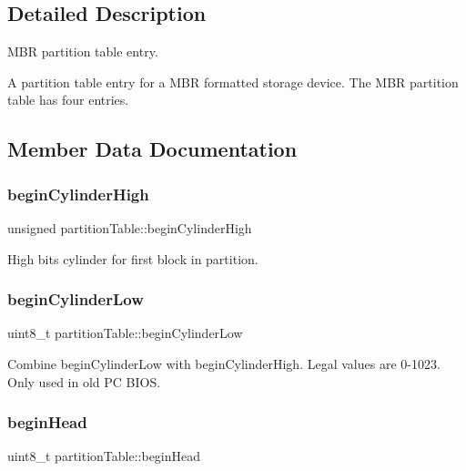 \subsection{Detailed Description}
M\+BR partition table entry. 

A partition table entry for a M\+BR formatted storage device. The M\+BR partition table has four entries. 

\subsection{Member Data Documentation}
\mbox{\label{structpartition_table_a744f0c7f9ad4c426b10de085b4f52392}} 
\subsubsection{\texorpdfstring{begin\+Cylinder\+High}{beginCylinderHigh}}
{\footnotesize\ttfamily unsigned partition\+Table\+::begin\+Cylinder\+High}

High bits cylinder for first block in partition. \mbox{\label{structpartition_table_a941fcb4df298f5f73ccca011bf40787a}} 
\subsubsection{\texorpdfstring{begin\+Cylinder\+Low}{beginCylinderLow}}
{\footnotesize\ttfamily uint8\+\_\+t partition\+Table\+::begin\+Cylinder\+Low}

Combine begin\+Cylinder\+Low with begin\+Cylinder\+High. Legal values are 0-\/1023. Only used in old PC B\+I\+OS. \mbox{\label{structpartition_table_a7d426694b8cf2151ae38568670a8c845}} 
\subsubsection{\texorpdfstring{begin\+Head}{beginHead}}
{\footnotesize\ttfamily uint8\+\_\+t partition\+Table\+::begin\+Head}

